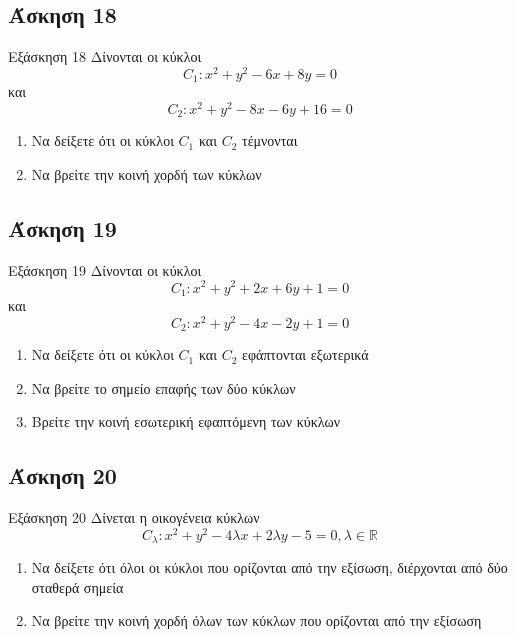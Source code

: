 \documentclass[greek]{beamer}
\begin{document}
\subsection{Άσκηση 18}
\begin{frame}[label=Άσκηση18,t]{Εξάσκηση 18}
  Δίνονται οι κύκλοι
  $$C_1:x^2+y^2-6x+8y=0$$
  και
  $$C_2:x^2+y^2-8x-6y+16=0$$
  \begin{enumerate}
    \item<1-> Να δείξετε ότι οι κύκλοι $C_1$ και $C_2$ τέμνονται
    \item<2-> Να βρείτε την κοινή χορδή των κύκλων
  \end{enumerate}

\end{frame}

\subsection{Άσκηση 19}
\begin{frame}[label=Άσκηση19,t]{Εξάσκηση 19}
  Δίνονται οι κύκλοι
  $$C_1:x^2+y^2+2x+6y+1=0$$
  και
  $$C_2:x^2+y^2-4x-2y+1=0$$
  \begin{enumerate}
    \item<1-> Να δείξετε ότι οι κύκλοι $C_1$ και $C_2$ εφάπτονται εξωτερικά
    \item<2-> Να βρείτε το σημείο επαφής των δύο κύκλων
    \item<3-> Βρείτε την κοινή εσωτερική εφαπτόμενη των κύκλων
  \end{enumerate}

\end{frame}

\subsection{Άσκηση 20}
\begin{frame}[label=Άσκηση20,t]{Εξάσκηση 20}
  Δίνεται η οικογένεια κύκλων
  $$C_λ:x^2+y^2-4λx+2λy-5=0,λ\in\mathbb{R}$$
  \begin{enumerate}
    \item<1-> Να δείξετε ότι όλοι οι κύκλοι που ορίζονται από την εξίσωση, διέρχονται από δύο σταθερά σημεία
    \item<2-> Να βρείτε την κοινή χορδή όλων των κύκλων που ορίζονται από την εξίσωση
  \end{enumerate}

\end{frame}
\end{document}
